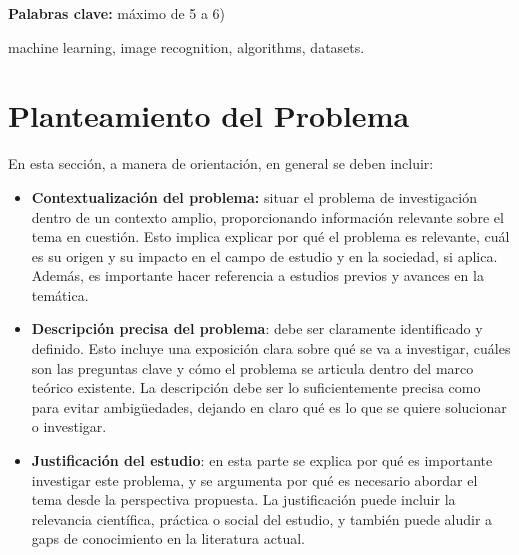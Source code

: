 \documentclass[a4paper,12pt]{article}
\begin{document}
\textbf{Palabras clave:} máximo de 5 a 6)
machine learning, image recognition, algorithms, datasets.

\section{Planteamiento del Problema}

En esta sección, a manera de orientación, en general se deben incluir:
\begin{itemize}
	\item \textbf{Contextualización del problema:} situar el problema de investigación dentro de un contexto amplio, proporcionando información relevante sobre el tema en cuestión. Esto implica explicar por qué el problema es relevante, cuál es su origen y su impacto en el campo de estudio y en la sociedad, si aplica. Además, es importante hacer referencia a estudios previos y avances en la temática.
\end{itemize}
\begin{itemize}
	\item \textbf{Descripción precisa del problema}: debe ser claramente identificado y definido. Esto incluye una exposición clara sobre qué se va a investigar, cuáles son las preguntas clave y cómo el problema se articula dentro del marco teórico existente. La descripción debe ser lo suficientemente precisa como para evitar ambigüedades, dejando en claro qué es lo que se quiere solucionar o investigar.
\end{itemize}
\begin{itemize}
	\item \textbf{Justificación del estudio}: en esta parte se explica por qué es importante investigar este problema, y se argumenta por qué es necesario abordar el tema desde la perspectiva propuesta. La justificación puede incluir la relevancia científica, práctica o social del estudio, y también puede aludir a gaps de conocimiento en la literatura actual.
\end{itemize}
\end{document}
